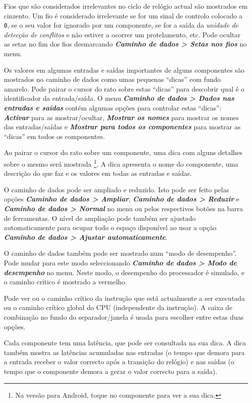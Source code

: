 \documentclass[11pt,a4paper,twoside,titlepage]{article}
\newcommand{\menupath}[1]{\textbf{\emph{#1}}}
\begin{document}
Fios que são considerados irrelevantes no ciclo de relógio actual são 
mostrados em cinzento.
Um fio é considerado irrelevante se for um sinal de controlo colocado a
\verb+0+, se o seu valor for ignorado por um componente, se for a saída da
\emph{unidade de detecção de conflitos} e não estiver a ocorrer um
protelamento, etc.
Pode ocultar as setas no fim dos fios desmarcando
\menupath{Caminho de dados > Setas nos fios} no menu.

Os valores em algumas entradas e saídas importantes de alguns componentes são
mostrados no caminho de dados como umas pequenas ``dicas'' com 
fundo amarelo.
Pode pairar o cursor do rato sobre estas ``dicas'' para descobrir qual é o
identificador da entrada/saída.
O menu \menupath{Caminho de dados > Dados nas entradas e saídas} contém algumas
opções para controlar estas ``dicas'': \menupath{Activar} para as mostrar/ocultar,
\menupath{Mostrar os nomes} para mostrar os nomes das entradas/saídas e
\menupath{Mostrar para todos os componentes} para mostrar as ``dicas'' em todos
os componentes.

Ao pairar o cursor do rato sobre um componente, uma dica com alguns detalhes
sobre o mesmo será mostrada \footnote{Na versão para Android, toque no
componente para ver a sua dica.}.
A dica apresenta o nome do componente, uma descrição do que faz e os valores
em todas as entradas e saídas.

O caminho de dados pode ser ampliado e reduzido. Isto pode ser feito pelas
opções \menupath{Caminho de dados > Ampliar},
\menupath{Caminho de dados > Reduzir} e \menupath{Caminho de dados > Normal}
no menu ou pelos respectivos botões na barra de ferramentas.
O nível de ampliação pode também ser ajustado automaticamente para ocupar todo
o espaço disponível ao usar a opção
\menupath{Caminho de dados > Ajustar automaticamente}.

\bigskip

O caminho de dados também pode ser mostrado num ``modo de desempenho''.
Pode mudar para este modo seleccionando 
\menupath{Caminho de dados > Modo de desempenho} no menu.
Neste modo, o desempenho do processador é simulado, e o caminho crítico
é mostrado a vermelho.

Pode ver ou o caminho crítico da instrução que está actualmente a ser
executada ou o caminho crítico global do CPU (independente da instrução).
A caixa de combinação no fundo do separador/janela é usada para escolher
entre estas duas opções.

Cada componente tem uma latência, que pode ser consultada na sua dica.
A dica também mostra as latências acumuladas nas entradas (o tempo que
demora para a entrada receber o valor correcto após a transição do relógio)
e nas saídas (o tempo que o componente demora a gerar o valor correcto para
a saída).
\end{document}
